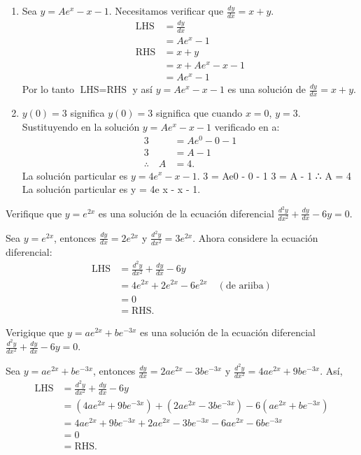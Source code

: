 \begin{enumerate}
	\item Sea $y=Ae^{x}-x-1$. Necesitamos verificar que $\frac{dy}{dx}=x+y$.
	\begin{align*}
	\text{LHS}
	&=\frac{dy}{dx}\\
	&=Ae^{x}-1\\
	\text{RHS}
	&=x+y\\
	&=x+Ae^{x}-x-1\\
	&=Ae^{x}-1
	\end{align*}
	Por lo tanto $\text{LHS}=\text{RHS}$ y así $y=Ae^{x}-x-1$ es una solución de $\frac{dy}{dx}=x+y$.
	\item $y\left(0\right)=3$ significa $y\left(0\right)=3$ significa que cuando $x=0$, $y=3$. Sustituyendo en la solución $y=Ae^{x}-x-1$  verificado en a:%
	\begin{align*}
	3&=Ae^{0}-0-1\\
	3&=A-1\\
	\therefore\quad A&=4.
	\end{align*}
	La solución particular es $y=4e^{x}-x-1$.
	3 = Ae0 - 0 - 1
	3 = A - 1
	∴
	A = 4
	La solución particular es y = 4e x - x - 1.
\end{enumerate}


\begin{example}
	Verifique que $y=e^{2x}$ es una solución de la ecuación diferencial $\frac{d^{2}y}{dx^{2}}+\frac{dy}{dx}-6y=0$.
\end{example}

Sea $y=e^{2x}$, entonces $\frac{dy}{dx}=2e^{2x}$ y $\frac{d^{2}y}{dx^{2}}=3e^{2x}$. Ahora considere la ecuación diferencial:
\begin{align*}
\text{LHS}
&=\frac{d^{2}y}{dx^{2}}+\frac{dy}{dx}-6y\\
&=4e^{2x}+2e^{2x}-6e^{2x}\quad(\text{de ariiba})\\
&=0\\
&=\text{RHS}.
\end{align*}

\begin{example}
	Verigique que $y=ae^{2x}+be^{-3x}$ es una solución de la ecuación diferencial $\frac{d^{2}y}{dx^{2}}+\frac{dy}{dx}-6y=0$.
\end{example}

Sea $y=ae^{2x}+be^{-3x}$, entonces $\frac{dy}{dx}=2ae^{2x}-3be^{-3x}$ y $\frac{d^{2}y}{dx^{2}}=4ae^{2x}+9be^{-3x}$. Así,
\begin{align*}
	\text{LHS}
	&=\frac{d^{2}y}{dx^{2}}+\frac{dy}{dx}-6y\\
	&=\left(4ae^{2x}+9be^{-3x}\right)+\left(2ae^{2x}-3be^{-3x}\right)-6\left(ae^{2x}+be^{-3x}\right)\\
	&=4ae^{2x}+9be^{-3x}+2ae^{2x}-3be^{-3x}-6ae^{2x}-6be^{-3x}\\
	&=0\\
	&=\text{RHS}.
\end{align*}

